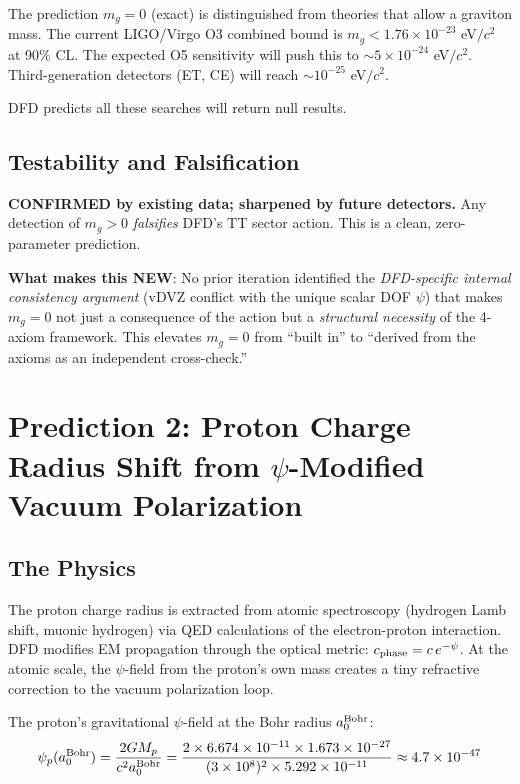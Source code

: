 \documentclass[11pt]{article}
\begin{document}
The prediction $m_g = 0$ (exact) is distinguished from theories that
allow a graviton mass.  The current LIGO/Virgo O3 combined bound is
$m_g < 1.76 \times 10^{-23}$ eV$/c^2$ at 90\% CL.  The expected
O5 sensitivity will push this to $\sim 5 \times 10^{-24}$ eV$/c^2$.
Third-generation detectors (ET, CE) will reach $\sim 10^{-25}$ eV$/c^2$.

DFD predicts all these searches will return null results.

\subsection{Testability and Falsification}

\textbf{CONFIRMED by existing data; sharpened by future detectors.}
Any detection of $m_g > 0$ \emph{falsifies} DFD's TT sector action.
This is a clean, zero-parameter prediction.

\textbf{What makes this NEW}: No prior iteration identified the
\emph{DFD-specific internal consistency argument} (vDVZ conflict with
the unique scalar DOF $\psi$) that makes $m_g = 0$ not just a
consequence of the action but a \emph{structural necessity} of the
4-axiom framework.  This elevates $m_g = 0$ from ``built in'' to
``derived from the axioms as an independent cross-check.''

\section{Prediction 2: Proton Charge Radius Shift from $\psi$-Modified
Vacuum Polarization}
\label{sec:proton-radius}

\subsection{The Physics}

The proton charge radius is extracted from atomic spectroscopy (hydrogen
Lamb shift, muonic hydrogen) via QED calculations of the electron-proton
interaction.  DFD modifies EM propagation through the optical metric:
$c_{\rm phase} = c\,e^{-\psi}$.  At the atomic scale, the $\psi$-field
from the proton's own mass creates a tiny refractive correction to the
vacuum polarization loop.

The proton's gravitational $\psi$-field at the Bohr radius $a_0^{\rm Bohr}$:
\begin{equation}
\psi_p(a_0^{\rm Bohr}) = \frac{2GM_p}{c^2 a_0^{\rm Bohr}}
= \frac{2 \times 6.674 \times 10^{-11} \times 1.673 \times 10^{-27}}
{(3 \times 10^8)^2 \times 5.292 \times 10^{-11}}
\approx 4.7 \times 10^{-47}
\end{equation}
\end{document}
